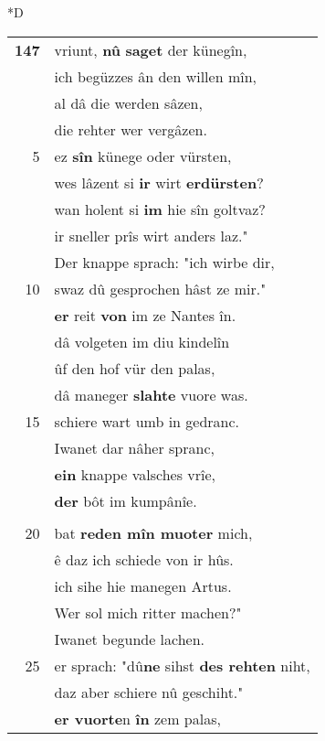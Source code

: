 \documentclass[8pt,a4paper,notitlepage]{article}
\begin{document}
\begin{table}[ht]
\begin{minipage}[t]{0.5\linewidth}
\small
\begin{center}*D
\end{center}
\begin{tabular}{rl}
\textbf{147} & vriunt, \textbf{nû} \textbf{saget} der künegîn,\\ 
 & ich begüzzes ân den willen mîn,\\ 
 & al dâ die werden sâzen,\\ 
 & die rehter wer vergâzen.\\ 
5 & ez \textbf{sîn} künege oder vürsten,\\ 
 & wes lâzent si \textbf{ir} wirt \textbf{erdürsten}?\\ 
 & wan holent si \textbf{im} hie sîn goltvaz?\\ 
 & ir sneller prîs wirt anders laz."\\ 
 & Der knappe sprach: "ich wirbe dir,\\ 
10 & swaz dû gesprochen hâst ze mir."\\ 
 & \textbf{er} reit \textbf{von} im ze Nantes în.\\ 
 & dâ volgeten im diu kindelîn\\ 
 & ûf den hof vür den palas,\\ 
 & dâ maneger \textbf{slahte} vuore was.\\ 
15 & schiere wart umb in gedranc.\\ 
 & Iwanet dar nâher spranc,\\ 
 & \textbf{ein} knappe valsches vrîe,\\ 
 & \textbf{der} bôt im kumpânîe.\\ 
 & \textbf{\textit{\begin{large}D\end{large}}er knappe sprach}: "got halde dich,\\ 
20 & bat \textbf{reden mîn muoter} mich,\\ 
 & ê daz ich schiede von ir hûs.\\ 
 & ich sihe hie manegen Artus.\\ 
 & Wer sol mich ritter machen?"\\ 
 & Iwanet begunde lachen.\\ 
25 & er sprach: "dû\textbf{ne} sihst \textbf{des rehten} niht,\\ 
 & daz aber schiere nû geschiht."\\ 
 & \textbf{er vuorte}n \textbf{în} zem palas,\\ 

\end{tabular}
\end{minipage}
\end{table}
\end{document}
